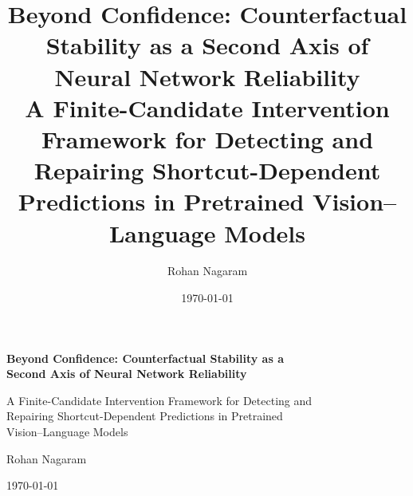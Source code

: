 \documentclass[11pt]{article}
\title{\textbf{Beyond Confidence: Counterfactual Stability as a Second Axis
of Neural Network Reliability}\\[0.4em]
\large A Finite-Candidate Intervention Framework for Detecting and Repairing
Shortcut-Dependent Predictions in Pretrained Vision--Language Models}
\author{Rohan Nagaram}
\date{\today}
\begin{document}
\begin{titlepage}
\centering
\thispagestyle{empty}
\vspace*{\fill}
{\LARGE\bfseries Beyond Confidence: Counterfactual Stability as a\\[0.35em]
Second Axis of Neural Network Reliability\par}
\vspace{1.4em}
{\large A Finite-Candidate Intervention Framework for Detecting and\\
Repairing Shortcut-Dependent Predictions in Pretrained\\
Vision--Language Models\par}
\vspace{3em}
{\large Rohan Nagaram\par}
\vspace{1.2em}
{\large \today\par}
\vspace*{\fill}
\end{titlepage}
\end{document}
